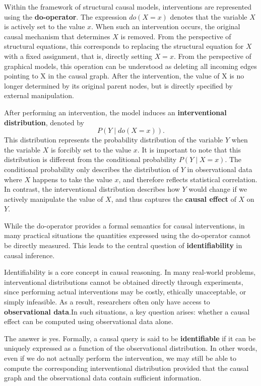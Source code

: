 \documentclass[a4paper]{report}
\begin{document}
Within the framework of structural causal models, interventions are represented using the \textbf{do-operator}\cite{10.1093/biomet/82.4.669}. The expression $do(X = x)$ denotes that the variable $X$ is actively set to the value $x$. When such an intervention occurs, the original causal mechanism that determines $X$ is removed. From the perspective of structural equations, this corresponds to replacing the structural equation for $X$ with a fixed assignment, that is, directly setting $X = x$. From the perspective of graphical models, this operation can be understood as deleting all incoming edges pointing to X in the causal graph. After the intervention, the value of X is no longer determined by its original parent nodes, but is directly specified by external manipulation.

After performing an intervention, the model induces an \textbf{interventional distribution}, denoted by
\[
P(Y \mid do(X = x)).
\]
This distribution represents the probability distribution of the variable $Y$ when the variable $X$ is forcibly set to the value $x$. It is important to note that this distribution is different from the conditional probability $P(Y \mid X = x)$. The conditional probability only describes the distribution of $Y$ in observational data where $X$ happens to take the value $x$, and therefore reflects statistical correlation. In contrast, the interventional distribution describes how $Y$ would change if we actively manipulate the value of $X$, and thus captures the \textbf{causal effect} of $X$ on $Y$.

While the do-operator provides a formal semantics for causal interventions, in many practical situations the quantities expressed using the do-operator cannot be directly measured. This leads to the central question of \textbf{identifiability} in causal inference.

Identifiability is a core concept in causal reasoning. 
In many real-world problems, interventional distributions cannot be obtained directly through experiments, since performing actual interventions may be costly, ethically unacceptable, or simply infeasible. 
As a result, researchers often only have access to \textbf{observational data}.In such situations, a key question arises: whether a causal effect can be computed using observational data alone.

The answer is yes. Formally, a causal query is said to be \textbf{identifiable} if it can be uniquely expressed as a function of the observational distribution. 
In other words, even if we do not actually perform the intervention, we may still be able to compute the corresponding interventional distribution provided that the causal graph and the observational data contain sufficient information.
\end{document}
